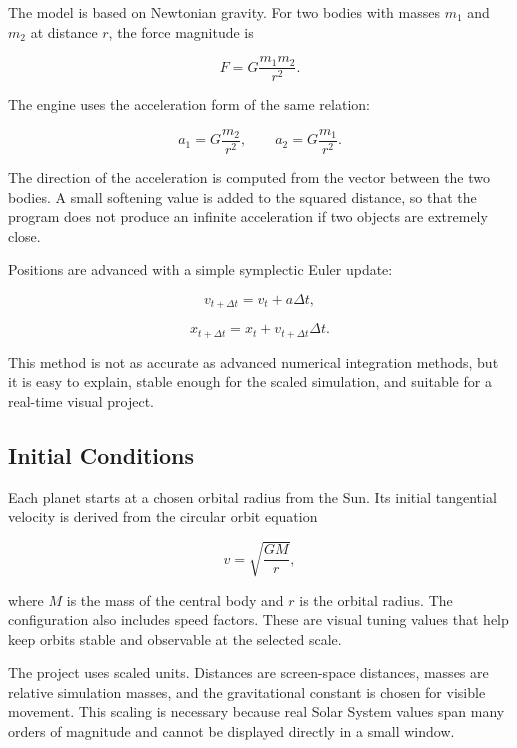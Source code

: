 \documentclass[a4paper,12pt]{article}
\begin{document}
The model is based on Newtonian gravity. For two bodies with masses $m_1$ and
$m_2$ at distance $r$, the force magnitude is

\begin{equation}
    F = G \frac{m_1 m_2}{r^2}.
\end{equation}

The engine uses the acceleration form of the same relation:

\begin{equation}
    a_1 = G \frac{m_2}{r^2}, \qquad
    a_2 = G \frac{m_1}{r^2}.
\end{equation}

The direction of the acceleration is computed from the vector between the two
bodies. A small softening value is added to the squared distance, so that the
program does not produce an infinite acceleration if two objects are extremely
close.

Positions are advanced with a simple symplectic Euler update:

\begin{equation}
    v_{t+\Delta t} = v_t + a \Delta t,
\end{equation}

\begin{equation}
    x_{t+\Delta t} = x_t + v_{t+\Delta t} \Delta t.
\end{equation}

This method is not as accurate as advanced numerical integration methods, but
it is easy to explain, stable enough for the scaled simulation, and suitable
for a real-time visual project.

\subsection{Initial Conditions}

Each planet starts at a chosen orbital radius from the Sun. Its initial
tangential velocity is derived from the circular orbit equation

\begin{equation}
    v = \sqrt{\frac{G M}{r}},
\end{equation}

where $M$ is the mass of the central body and $r$ is the orbital radius. The
configuration also includes speed factors. These are visual tuning values that
help keep orbits stable and observable at the selected scale.

The project uses scaled units. Distances are screen-space distances, masses are
relative simulation masses, and the gravitational constant is chosen for
visible movement. This scaling is necessary because real Solar System values
span many orders of magnitude and cannot be displayed directly in a small
window.
\end{document}
